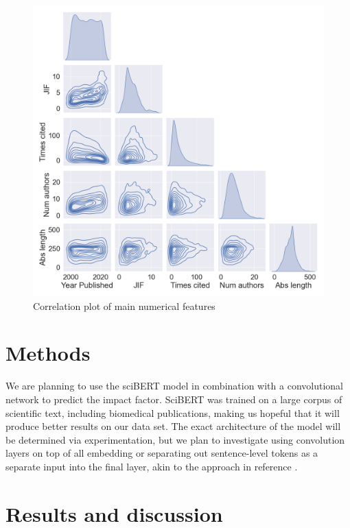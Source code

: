 \documentclass[11pt]{article}
\begin{document}
\begin{figure}
	\includegraphics[width= \columnwidth]{./Images/Pairplot.png}
	\caption{Correlation plot of main numerical features}
	\label{fig:paiplot}
\end{figure}

\section{Methods}
We are planning to use the sciBERT model in combination with a convolutional network to predict the impact factor. SciBERT was trained on a large corpus of scientific text, including biomedical publications, making us hopeful that it will produce better results on our data set. The exact architecture of the model will be determined via experimentation, but we plan to investigate using convolution layers on top of all embedding or separating out sentence-level tokens as a separate input into the final layer, akin to the approach in reference \citep{hs2022}.

\section{Results and discussion}
\end{document}
